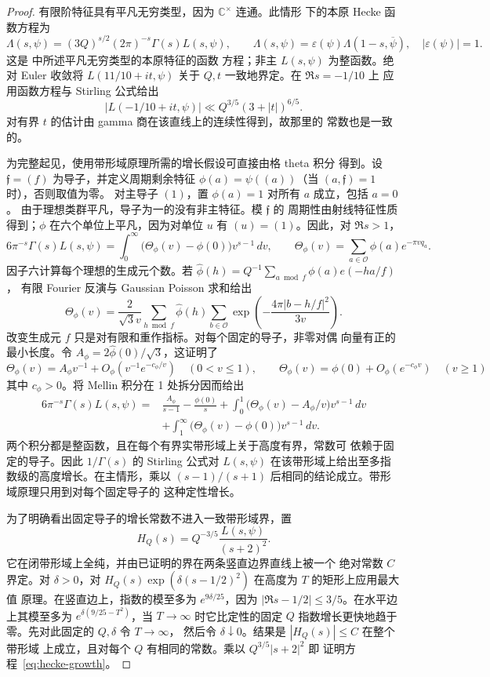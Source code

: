 \documentclass[11pt,a4paper]{article}
\numberwithin{equation}{section}
\numberwithin{figure}{section}
\theoremstyle{definition}
\theoremstyle{remark}
\begin{document}
\begin{proof}
有限阶特征具有平凡无穷类型，因为 $\mathbb C^\times$ 连通。此情形
下的本原 Hecke 函数方程为
\[
 \Lambda(s,\psi)=(3Q)^{s/2}(2\pi)^{-s}\Gamma(s)L(s,\psi),\qquad
 \Lambda(s,\psi)=\varepsilon(\psi)\Lambda(1-s,\overline\psi),
 \quad |\varepsilon(\psi)|=1.
\]
这是 \cite[方程 (1.1)]{GZ} 中所述平凡无穷类型的本原特征的函数
方程；非主 $L(s,\psi)$ 为整函数。绝对 Euler 收敛将
$L(11/10+it,\psi)$ 关于 $Q,t$ 一致地界定。在 $\Re s=-1/10$ 上
应用函数方程与 Stirling 公式给出
\[
 |L(-1/10+it,\psi)|\ll Q^{3/5}(3+|t|)^{6/5}.
\]
对有界 $t$ 的估计由 gamma 商在该直线上的连续性得到，故那里的
常数也是一致的。

为完整起见，使用带形域原理所需的增长假设可直接由格 theta 积分
得到。设 $\mathfrak f=(f)$ 为导子，并定义周期剩余特征
$\phi(a)=\psi((a))$（当 $(a,\mathfrak f)=1$ 时），否则取值为零。
对主导子 $(1)$，置 $\phi(a)=1$ 对所有 $a$ 成立，包括 $a=0$。
由于理想类群平凡，导子为一的没有非主特征。模 $\mathfrak f$ 的
周期性由射线特征性质得到；$\phi$ 在六个单位上平凡，因为对单位
$u$ 有 $(u)=(1)$。因此，对 $\Re s>1$，
\[
 6\pi^{-s}\Gamma(s)L(s,\psi)
 =\int_0^\infty\bigl(\Theta_\phi(v)-\phi(0)\bigr)v^{s-1}\,dv,
 \qquad
 \Theta_\phi(v)=\sum_{a\in\mathcal O}\phi(a)e^{-\pi vq_a}.
\]
因子六计算每个理想的生成元个数。若
$\widehat\phi(h)=Q^{-1}\sum_{a\bmod f}\phi(a)e(-ha/f)$，
有限 Fourier 反演与 Gaussian Poisson 求和给出
\[
 \Theta_\phi(v)=\frac{2}{\sqrt3v}
 \sum_{h\bmod f}\widehat\phi(h)
 \sum_{b\in\mathcal O}
    \exp\left(-\frac{4\pi|b-h/f|^2}{3v}\right).
\]
改变生成元 $f$ 只是对有限和重作指标。对每个固定的导子，非零对偶
向量有正的最小长度。令 $A_\phi=2\widehat\phi(0)/\sqrt3$，这证明了
\[
 \Theta_\phi(v)=A_\phi v^{-1}+O_\phi(v^{-1}e^{-c_\phi/v})\quad(0<v\le1),
 \qquad
 \Theta_\phi(v)=\phi(0)+O_\phi(e^{-c_\phi v})\quad(v\ge1)
\]
其中 $c_\phi>0$。将 Mellin 积分在 1 处拆分因而给出
\[
 \begin{split}
 6\pi^{-s}\Gamma(s)L(s,\psi)
 ={}&\frac{A_\phi}{s-1}-\frac{\phi(0)}s
 +\int_0^1\bigl(\Theta_\phi(v)-A_\phi/v\bigr)v^{s-1}\,dv\\
 &+\int_1^\infty\bigl(\Theta_\phi(v)-\phi(0)\bigr)v^{s-1}\,dv.
 \end{split}
\]
两个积分都是整函数，且在每个有界实带形域上关于高度有界，常数可
依赖于固定的导子。因此 $1/\Gamma(s)$ 的 Stirling 公式对
$L(s,\psi)$ 在该带形域上给出至多指数级的高度增长。在主情形，乘以
$(s-1)/(s+1)$ 后相同的结论成立。带形域原理只用到对每个固定导子的
这种定性增长。

为了明确看出固定导子的增长常数不进入一致带形域界，置
\[
 H_Q(s)=Q^{-3/5}\frac{L(s,\psi)}{(s+2)^2}.
\]
它在闭带形域上全纯，并由已证明的界在两条竖直边界直线上被一个
绝对常数 $C$ 界定。对 $\delta>0$，对
$H_Q(s)\exp(\delta(s-1/2)^2)$ 在高度为 $T$ 的矩形上应用最大值
原理。在竖直边上，指数的模至多为 $e^{9\delta/25}$，因为
$|\Re s-1/2|\le3/5$。在水平边上其模至多为
$e^{\delta(9/25-T^2)}$，当 $T\to\infty$ 时它比定性的固定 $Q$
指数增长更快地趋于零。先对此固定的 $Q,\delta$ 令 $T\to\infty$，
然后令 $\delta\downarrow0$。结果是 $|H_Q(s)|\le C$ 在整个带形域
上成立，且对每个 $Q$ 有相同的常数。乘以 $Q^{3/5}|s+2|^2$ 即
证明方程~\eqref{eq:hecke-growth}。


\end{proof}
\end{document}
